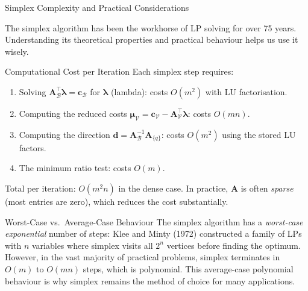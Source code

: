 \documentclass[aspectratio=169,10pt]{beamer}
\newcommand{\cv}{\mathbf{c}}
\newcommand{\Av}{\mathbf{A}}
\newcommand{\muv}{\boldsymbol{\mu}}
\newcommand{\lav}{\boldsymbol{\lambda}}
\newcommand{\calB}{\mathcal{B}}
\newcommand{\calV}{\mathcal{V}}
\begin{document}
\begin{frame}[allowframebreaks]{Simplex Complexity and Practical Considerations}

The simplex algorithm has been the workhorse of LP solving for over 75 years.
Understanding its theoretical properties and practical behaviour helps us use it
wisely.

\begin{block}{Computational Cost per Iteration}
Each simplex step requires:
\begin{enumerate}
  \item Solving $\Av_\calB^\top\lav = \cv_\calB$ for $\lav$ (lambda):
        costs $O(m^2)$ with LU factorisation.
  \item Computing the reduced costs $\muv_\calV = \cv_\calV - \Av_\calV^\top\lav$:
        costs $O(mn)$.
  \item Computing the direction $\mathbf{d} = \Av_\calB^{-1}\Av_{\{q\}}$:
        costs $O(m^2)$ using the stored LU factors.
  \item The minimum ratio test: costs $O(m)$.
\end{enumerate}
Total per iteration: $O(m^2 n)$ in the dense case.  In practice, $\Av$ is often
\emph{sparse} (most entries are zero), which reduces the cost substantially.
\end{block}

\begin{block}{Worst-Case vs.\ Average-Case Behaviour}
The simplex algorithm has a \emph{worst-case exponential} number of steps:
Klee and Minty (1972) constructed a family of LPs with $n$ variables where
simplex visits all $2^n$ vertices before finding the optimum.  However,
in the vast majority of practical problems, simplex terminates in $O(m)$ to $O(mn)$
steps, which is polynomial.  This average-case polynomial behaviour is why simplex
remains the method of choice for many applications.
\end{block}


\end{frame}
\end{document}
